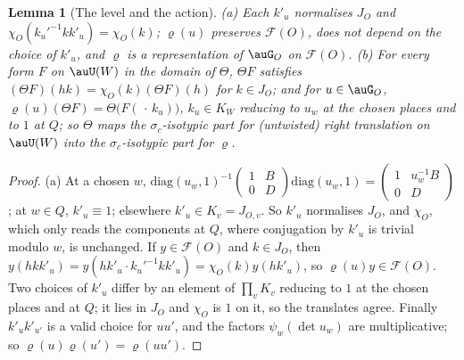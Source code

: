 \documentclass[10pt]{amsart}
\newtheorem{lemma}[theorem]{Lemma}
\theoremstyle{definition}
\theoremstyle{remark}
\begin{document}
\begin{lemma}[The level and the action]\label{prm:level}
{\rm(a)} Each $k'_u$ normalises $J_O$ and $\chi_O(k_u'^{-1}kk'_u)=\chi_O(k)$; $\varrho(u)$ preserves
$\mathcal F(O)$, does not depend on the choice of $k'_u$, and $\varrho$ is a representation of $\auG_O$
on $\mathcal F(O)$.
{\rm(b)} For every form $F$ on $\auU(W)$ in the domain of $\Theta$, $\Theta F$ satisfies $(\Theta F)(hk)=
\chi_O(k)(\Theta F)(h)$ for $k\in J_O$; and for $u\in\auG_O$, $\varrho(u)(\Theta F)=\Theta\bigl(F(\,\cdot\,k_u)\bigr)$, $k_u\in K_W$
reducing to $u_w$ at the chosen places and to $1$ at $Q$; so $\Theta$ maps the $\sigma_c$-isotypic
part for (untwisted) right translation on $\auU(W)$ into the $\sigma_c$-isotypic part for $\varrho$.
\end{lemma}
\begin{proof}
(a) At a chosen $w$, $\mathrm{diag}(u_w,1)^{-1}\left(\begin{smallmatrix}1&B\\0&D\end{smallmatrix}\right)
\mathrm{diag}(u_w,1)=\left(\begin{smallmatrix}1&u_w^{-1}B\\0&D\end{smallmatrix}\right)$; at $w\in Q$,
$k'_u\equiv1$; elsewhere $k'_u\in K_v=J_{O,v}$. So $k'_u$ normalises $J_O$, and $\chi_O$, which only reads
the components at $Q$, where conjugation by $k'_u$ is trivial modulo $w$, is unchanged. If $y\in
\mathcal F(O)$ and $k\in J_O$, then $y(hkk'_u)=y(hk'_u\cdot k_u'^{-1}kk'_u)=\chi_O(k)y(hk'_u)$, so
$\varrho(u)y\in\mathcal F(O)$. Two choices of $k'_u$ differ by an element of $\prod_vK_v$ reducing to $1$
at the chosen places and at $Q$; it lies in $J_O$ and $\chi_O$ is $1$ on it, so the translates agree.
Finally $k'_uk'_{u'}$ is a valid choice for $uu'$, and the factors $\psi_w(\det u_w)$ are
multiplicative; so $\varrho(u)\varrho(u')=\varrho(uu')$.


\end{proof}
\end{document}
